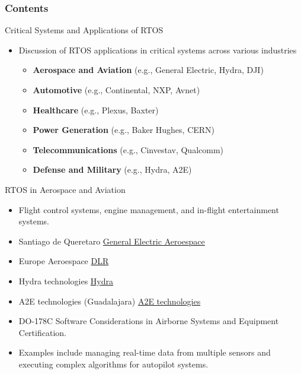 \documentclass[10pt]{beamer}
\title[Universidad Panamericana]{}
\subtitle{Critical Systems and Applications of RTOS}
\author[]{Name}
\institute[ltonix@up.edu.mx]{Universidad Panamericana}
\date[Presentation \today]
{Presentation \today}
\begin{document}
\frame{\titlepage}
\begin{frame}
\frametitle{Contents}
\tableofcontents
\end{frame}


\begin{frame}{Critical Systems and Applications of RTOS}
    \begin{itemize}
        \item Discussion of RTOS applications in critical systems across various industries
        \begin{itemize}
            \item \textbf{Aerospace and Aviation} (e.g., General Electric, Hydra, DJI)
            \item \textbf{Automotive} (e.g., Continental, NXP, Avnet)
            \item \textbf{Healthcare} (e.g., Plexus, Baxter)
            \item \textbf{Power Generation} (e.g., Baker Hughes, CERN)
            \item \textbf{Telecommunications} (e.g., Cinvestav, Qualcomm)
            \item \textbf{Defense and Military} (e.g., Hydra, A2E)
        \end{itemize}
    \end{itemize}
\end{frame}

\begin{frame}{RTOS in Aerospace and Aviation}
    \begin{itemize}
        \item Flight control systems, engine management, and in-flight entertainment systems.
        \item Santiago de Queretaro \href{https://www.geaerospace.com/commercial}{General Electric Aeroespace}
        \item Europe Aeroespace \href{https://www.dlr.de/en/careers/your-entry/your-specialist-field/research-funding-knowledge-management}{DLR}
        \item Hydra technologies \href{https://www.hydra-technologies.com/}{Hydra}
        \item A2E technologies (Guadalajara) \href{https://www.a2etechnologies.com/}{A2E technologies}
        \item DO-178C Software Considerations in Airborne Systems and Equipment Certification.
        \item Examples include managing real-time data from multiple sensors and executing complex algorithms for autopilot systems.
    \end{itemize}
\end{frame}
\end{document}

